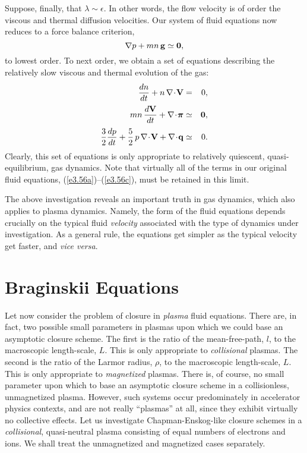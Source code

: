 Suppose, finally, that $\lambda\sim \epsilon$. In other words, the flow
velocity is of order the viscous and thermal diffusion velocities. Our system
of fluid equations now reduces to a force balance criterion,
\begin{equation}
\nabla p + mn\,{\bf g} \simeq {\bf 0},
\end{equation}
to lowest order. To next order, we obtain a set of equations
describing the relatively slow viscous and thermal evolution 
of the gas:
\begin{eqnarray}
\frac{dn}{dt} + n\,\nabla\!\cdot\!{\bf V} &=& 0,\\[0.5ex]
m n\,\frac{d {\bf V}}{dt} + \nabla\!\cdot \!\bpi 
& \simeq& {\bf 0},\\[0.5ex]
\frac{3}{2}\frac{d p}{dt} + \frac{5}{2}\,p\,\nabla\!\cdot\!{\bf V}
+ \nabla\!\cdot\!{\bf q} &\simeq& 0.
\end{eqnarray}
Clearly, this set of equations is only appropriate to relatively quiescent,
quasi-equilibrium, gas dynamics. Note that virtually all of the terms
in our original fluid  equations, (\ref{e3.56a})--(\ref{e3.56c}), must be retained in this limit.

The above investigation reveals an important truth in gas dynamics, which also
applies to plasma dynamics. Namely, the form of the
fluid equations depends crucially on the typical fluid {\em velocity}\/ 
associated with the type of dynamics under investigation. As a general rule,
the equations get simpler as the typical velocity  get faster, and {\em vice versa}. 

\section{Braginskii Equations}
Let now consider the problem of closure in {\em plasma}\/ fluid equations. There are, in
fact, two possible small parameters in plasmas upon which we could
 base an asymptotic
closure scheme. The first is the ratio of the mean-free-path, $l$, to the
macroscopic length-scale, $L$. This is only appropriate to {\em collisional}\/ 
plasmas. The second is the ratio of the Larmor radius, $\rho$, to the macroscopic
length-scale, $L$. This is only appropriate to {\em magnetized} plasmas. 
There is, of course, no small parameter upon which to base an asymptotic
closure scheme in a collisionless, unmagnetized plasma. However, such systems
occur predominately in accelerator physics contexts, and are not really 
``plasmas'' at all,
since they exhibit virtually no collective effects. Let us
 investigate 
Chapman-Enskog-like closure schemes
in a {\em collisional}, quasi-neutral plasma consisting of
equal numbers of electrons and ions. We shall treat the 
unmagnetized and magnetized cases
separately. 


